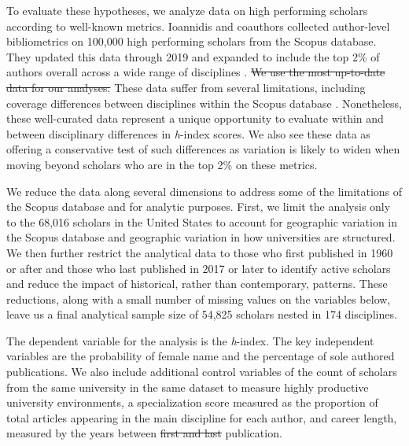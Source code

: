 \documentclass[
  10pt,
  letterpaper,
]{article}
\providecommand{\DIFaddtex}[1]{{\protect\color{blue}\uwave{#1}}} %
\providecommand{\DIFdeltex}[1]{{\protect\color{red}\sout{#1}}}                      %
\providecommand{\DIFaddbegin}{} %
\providecommand{\DIFaddend}{} %
\providecommand{\DIFdelbegin}{} %
\providecommand{\DIFdelend}{} %
\providecommand{\DIFadd}[1]{\texorpdfstring{\DIFaddtex{#1}}{#1}} %
\providecommand{\DIFdel}[1]{\texorpdfstring{\DIFdeltex{#1}}{}} %
\newcommand{\DIFscaledelfig}{0.5}
\newlength{\DIFdelgraphicswidth} %
\newlength{\DIFdelgraphicsheight} %
\newcommand{\DIFaddincludegraphics}[2][]{{\color{blue}\fbox{\DIFOincludegraphics[#1]{#2}}}} %
\newcommand{\DIFdelincludegraphics}[2][]{%
\sbox{\DIFdelgraphicsbox}{\DIFOincludegraphics[#1]{#2}}%
\settoboxwidth{\DIFdelgraphicswidth}{\DIFdelgraphicsbox} %
\settoboxtotalheight{\DIFdelgraphicsheight}{\DIFdelgraphicsbox} %
\scalebox{\DIFscaledelfig}{%
\parbox[b]{\DIFdelgraphicswidth}{\usebox{\DIFdelgraphicsbox}\\[-\baselineskip] \rule{\DIFdelgraphicswidth}{0em}}\llap{\resizebox{\DIFdelgraphicswidth}{\DIFdelgraphicsheight}{%
\setlength{\unitlength}{\DIFdelgraphicswidth}%
\begin{picture}(1,1)%
\thicklines\linethickness{2pt} %
{\color[rgb]{1,0,0}\put(0,0){\framebox(1,1){}}}%
{\color[rgb]{1,0,0}\put(0,0){\line( 1,1){1}}}%
{\color[rgb]{1,0,0}\put(0,1){\line(1,-1){1}}}%
\end{picture}%
}\hspace*{3pt}}} %
} %
\DeclareRobustCommand{\DIFaddbegin}{\DIFOaddbegin \let\includegraphics\DIFaddincludegraphics} %
\DeclareRobustCommand{\DIFaddend}{\DIFOaddend \let\includegraphics\DIFOincludegraphics} %
\DeclareRobustCommand{\DIFdelbegin}{\DIFOdelbegin \let\includegraphics\DIFdelincludegraphics} %
\DeclareRobustCommand{\DIFdelend}{\DIFOaddend \let\includegraphics\DIFOincludegraphics} %
\begin{document}
To evaluate these hypotheses, we analyze data on high performing
scholars according to well-known metrics. Ioannidis and coauthors
\citep{ioannidis_standardized_2019} collected author-level bibliometrics
on 100,000 high performing scholars from the Scopus database. They
updated this data through 2019 and expanded to include the top 2\% of
authors overall across a wide range of disciplines
\citep{ioannidis_updated_2020}. \DIFdelbegin \DIFdel{We use the most up-to-date data for our
analyses. }\DIFdelend These data suffer from several
limitations, including coverage differences between disciplines within
the Scopus database \citep{mongeon_journal_2016, singh_journal_2021}.
Nonetheless, these well-curated data represent a unique opportunity to
evaluate within and between disciplinary differences in \emph{h}-index
scores. We also see these data as offering a conservative test of such
differences as variation is likely to widen when moving beyond scholars
who are in the top 2\% on these metrics.

We reduce the data along several dimensions to address some of the
limitations of the Scopus database and for analytic purposes. First, we
limit the analysis only to the 68,016 scholars in the United States to
account for geographic variation in the Scopus database and geographic
variation in how universities are structured. We then further restrict
the analytical data to those who first published in 1960 or after and
those who last published in 2017 or later to identify active scholars
and reduce the impact of historical, rather than contemporary, patterns.
These reductions, along with a small number of missing values on the
variables below, leave us a final analytical sample size of 54,825
scholars nested in 174 disciplines.

The dependent variable for the analysis is the \emph{h}-index. The key
independent variables are the probability of female name and the
percentage of sole authored publications. We also include additional
control variables of the count of scholars from the same university in
the same dataset to measure highly productive university environments, a
specialization score measured as the proportion of total articles
appearing in the main discipline for each author, and career length,
measured by the years between \DIFdelbegin \DIFdel{first and last }\DIFdelend \DIFaddbegin \DIFadd{each scholar's first and most recent
}\DIFaddend publication.
\end{document}
